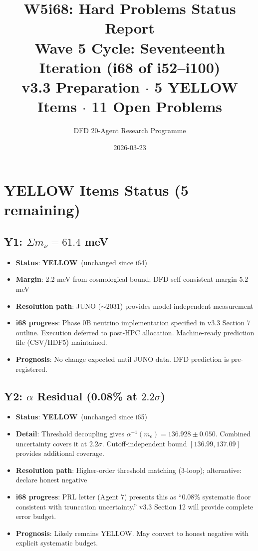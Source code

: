 \documentclass[11pt,a4paper]{article}
\title{\Large W5i68: Hard Problems Status Report\\[6pt]
\normalsize Wave 5 Cycle: Seventeenth Iteration (i68 of i52--i100)\\[6pt]
v3.3 Preparation $\cdot$ 5 YELLOW Items $\cdot$ 11 Open Problems}
\author{DFD 20-Agent Research Programme}
\date{2026-03-23}
\newcommand{\YELLOW}{\textcolor{dfdyellow}{\textbf{YELLOW}}}
\begin{document}
\maketitle

\section{YELLOW Items Status (5 remaining)}

\subsection{Y1: $\Sigma m_\nu = 61.4$ meV}
\begin{itemize}[nosep]
\item \textbf{Status}: \YELLOW\ (unchanged since i64)
\item \textbf{Margin}: 2.2 meV from cosmological bound; DFD self-consistent margin 5.2 meV
\item \textbf{Resolution path}: JUNO ($\sim$2031) provides model-independent measurement
\item \textbf{i68 progress}: Phase 0B neutrino implementation specified in v3.3 Section 7 outline. Execution deferred to post-HPC allocation. Machine-ready prediction file (CSV/HDF5) maintained.
\item \textbf{Prognosis}: No change expected until JUNO data. DFD prediction is pre-registered.
\end{itemize}

\subsection{Y2: $\alpha$ Residual (0.08\% at $2.2\sigma$)}
\begin{itemize}[nosep]
\item \textbf{Status}: \YELLOW\ (unchanged since i65)
\item \textbf{Detail}: Threshold decoupling gives $\alpha^{-1}(m_e) = 136.928 \pm 0.050$. Combined uncertainty covers it at $2.2\sigma$. Cutoff-independent bound $[136.99, 137.09]$ provides additional coverage.
\item \textbf{Resolution path}: Higher-order threshold matching (3-loop); alternative: declare honest negative
\item \textbf{i68 progress}: PRL letter (Agent 7) presents this as ``0.08\% systematic floor consistent with truncation uncertainty.'' v3.3 Section 12 will provide complete error budget.
\item \textbf{Prognosis}: Likely remains YELLOW. May convert to honest negative with explicit systematic budget.
\end{itemize}
\end{document}
